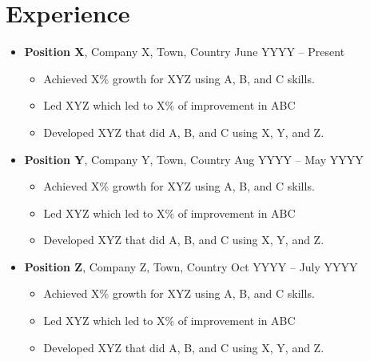 \documentclass[12pt,a4paper]{article}
\begin{document}
\section{Experience}
\begin{itemize}[leftmargin=0cm, topsep=-2em, itemsep=-0.0em, label={}]
\item \textbf{Position X}, Company X, Town, Country \hfill June YYYY -- Present
\begin{itemize}[leftmargin=*, topsep=-2em, itemsep=-0.7em, label=\textbullet]
\item Achieved X\% growth for XYZ using A, B, and C skills.
\item Led XYZ which led to X\% of improvement in ABC
\item Developed XYZ that did A, B, and C using X, Y, and Z.
\end{itemize}
\item \textbf{Position Y}, Company Y, Town, Country \hfill Aug YYYY -- May YYYY
\begin{itemize}[leftmargin=*, topsep=-2em, itemsep=-0.7em, label=\textbullet]
\item Achieved X\% growth for XYZ using A, B, and C skills.
\item Led XYZ which led to X\% of improvement in ABC
\item Developed XYZ that did A, B, and C using X, Y, and Z.
\end{itemize}
\item \textbf{Position Z}, Company Z, Town, Country \hfill Oct YYYY -- July YYYY
\begin{itemize}[leftmargin=*, topsep=-2em, itemsep=-0.7em, label=\textbullet]
\item Achieved X\% growth for XYZ using A, B, and C skills.
\item Led XYZ which led to X\% of improvement in ABC
\item Developed XYZ that did A, B, and C using X, Y, and Z.
\end{itemize}
\end{itemize}
\end{document}
